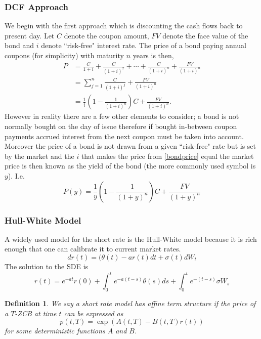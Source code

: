\documentclass[12pt&a4paper]{article}
\newtheorem{definition}[theorem]{Definition}
\numberwithin{equation}{section}
\begin{document}
\subsubsection{DCF Approach}
We begin with the first approach which is discounting the cash flows back to present day. Let $C$ denote the coupon amount, $FV$ denote the face value of the bond and $i$ denote ``risk-free" interest rate. The price of a bond paying annual coupons (for simplicity) with maturity $n$ years is then,
\begin{align}
P&= \frac{C}{1+i}+\frac{C}{(1+i)^2}+\cdots + \frac{C}{(1+i)^n} + \frac{FV}{(1+i)^n}\nonumber\\
&= \sum_{j=1}^{n}\frac{C}{(1+i)^j} + \frac{FV}{(1+i)^n}\nonumber\\
&= \frac{1}{i}\left(1-\frac{1}{(1+i)^n}\right) C + \frac{FV}{(1+i)^n}\label{bondprice}.
\end{align}
However in reality there are a few other elements to consider; a bond is not normally bought on the day of issue therefore if bought in-between coupon payments accrued interest from the next coupon must be taken into account. Moreover the price of a bond is not drawn from a given ``risk-free" rate but is set by the market and the $i$ that makes the price from \eqref{bondprice} equal the market price is then known as the yield of the bond (the more commonly used symbol is $y$). I.e.
\begin{equation}\label{pricefromyield}
P(y)=\frac{1}{y}\left(1-\frac{1}{(1+y)^n}\right) C + \frac{FV}{(1+y)^n}
\end{equation}


\subsubsection{Hull-White Model}
A widely used model for the short rate is the Hull-White model because it is rich enough that one can calibrate it to current market rates.
\begin{equation}
dr(t) = (\theta(t)-a r(t)dt +\sigma(t)dW_t
\end{equation}
The solution to the SDE is
\begin{equation}
r(t)= e^{-at}r(0)+\int_{0}^{t}e^{-a(t-s)}\theta(s) ds + \int_{0}^{t}e^{-(t-s)}\sigma W_s
\end{equation}

\begin{definition}
	We say a short rate model has affine term structure if the price of a $T$-ZCB at time $t$ can be expressed as
	\begin{equation}
	p(t, T) = \exp (A(t, T) - B(t, T)r(t))
	\end{equation}
	for some deterministic functions $A$ and $B$.
\end{definition}
\end{document}

